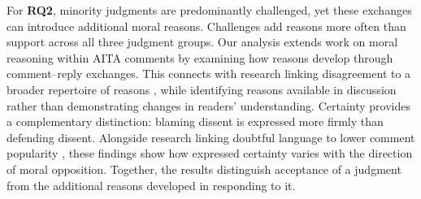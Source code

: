 For \textbf{RQ2}, minority judgments are predominantly challenged,
yet these exchanges can introduce additional moral reasons. Challenges
add reasons more often than support across all three judgment groups.
Our analysis extends work on moral reasoning within AITA comments
\cite{xi2024morality} by examining how reasons develop through
comment--reply exchanges. This connects with research linking
disagreement to a broader repertoire of reasons
\cite{price2002disagreement}, while identifying reasons available in
discussion rather than demonstrating changes in readers' understanding.
Certainty provides a complementary distinction: blaming dissent is
expressed more firmly than defending dissent. Alongside research
linking doubtful language to lower comment popularity
\cite{evans2023doubt}, these findings show how expressed certainty varies
with the direction of moral opposition. Together, the results distinguish
acceptance of a judgment from the additional reasons developed in
responding to it.

